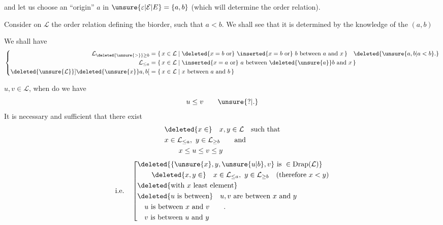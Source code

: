 and let us choose an ``origin'' $a$ in $\unsure{\varepsilon|\mathcal E|E}=\{a,b\}$ (which will determine the order relation).

  Consider on $\mathcal L$ the order relation defining the biorder, such that $a<b$. We shall see that it is  determined by the knowledge of the  $(a,b)$

We shall have 
\[
\left\{\begin{aligned}
\mathcal L_{\deleted{\unsure{>}}\geq b}&=\{\,x\in\mathcal L\mid\deleted{x=b\text{ or}}\ \inserted{x=b\text{ or}}\ b\text{ between }a\text{ and }x\,\}\quad\deleted{\unsure{a,b|a<b}.}\\
\mathcal L_{\leq a}&=\{\,x\in\mathcal L\mid\inserted{x=a\text{ or}}\ a\text{ between }\deleted{\unsure{a}}b\text{ and }x\,\}\\
\deleted{\unsure{\mathcal L}}\mathopen{]}\deleted{\unsure{x}}a,b\mathclose{[}&=\{\,x\in\mathcal L\mid x\text{ between }a\text{ and }b\,\}
\end{aligned}\right.
\]

 $u,v\in\mathcal L$, when do we have
\[
u\leq v\qquad\unsure{\mathord{?}|.}
\]
It is necessary and sufficient that there exist
\[
\begin{aligned}
&\deleted{x\in}\quad x,y\in\mathcal L\quad\text{such that}\\
&x\in\mathcal L_{\leq a},\ y\in\mathcal L_{\geq b}\qquad\text{and}\\
&\hspace{2em}x\leq u\leq v\leq y
\end{aligned}
\]
\[
\text{i.e.}\quad
\left[\begin{aligned}
&\deleted{\{\unsure{x},y,\unsure{u|b},v\}\ \text{is }\in\mathrm{Drap}(\mathcal L)}\\
&\qquad\deleted{x,y\in}\quad x\in\mathcal L_{\leq a},\ y\in\mathcal L_{\geq b}\quad(\text{therefore }x<y)\\
&\deleted{\text{with }x\text{ least element}}\\
&\deleted{u\text{ is between}}\quad u,v\text{ are between }x\text{ and }y\\
&\quad u\text{ is between }x\text{ and }v\qquad.\\
&\quad v\text{ is between }u\text{ and }y
\end{aligned}\right.
\]

